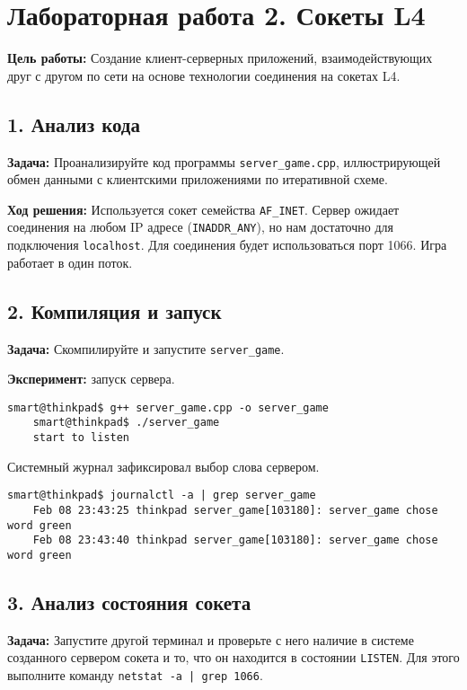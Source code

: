 \chapter*{Лабораторная работа 2. Сокеты L4}

\textbf{Цель работы:} Создание клиент-серверных приложений, взаимодействующих друг с другом по сети на основе технологии соединения на сокетах L4.

\section*{1. Анализ кода}
\textbf{Задача:} Проанализируйте код программы \texttt{server\_game.cpp}, иллюстрирующей обмен данными с клиентскими приложениями по итеративной схеме.

\textbf{Ход решения:} Используется сокет семейства \texttt{AF\_INET}. Сервер ожидает соединения на любом IP адресе (\texttt{INADDR\_ANY}), но нам достаточно для подключения \texttt{localhost}. Для соединения будет использоваться порт 1066. Игра работает в один поток.

\section*{2. Компиляция и запуск}
\textbf{Задача:} Скомпилируйте и запустите \texttt{server\_game}.

\textbf{Эксперимент:} запуск сервера.
\begin{Verbatim}[frame=single,breaklines=true,breakanywhere=true]
    smart@thinkpad$ g++ server_game.cpp -o server_game
    smart@thinkpad$ ./server_game 
    start to listen

\end{Verbatim}

Системный журнал зафиксировал выбор слова сервером.
\begin{Verbatim}[frame=single,breaklines=true,breakanywhere=true]
    smart@thinkpad$ journalctl -a | grep server_game
    Feb 08 23:43:25 thinkpad server_game[103180]: server_game chose word green
    Feb 08 23:43:40 thinkpad server_game[103180]: server_game chose word green
\end{Verbatim}

\section*{3. Анализ состояния сокета}
\textbf{Задача:} Запустите другой терминал и проверьте с него наличие в системе созданного сервером сокета и то, что он находится в состоянии \texttt{LISTEN}. Для этого выполните команду \texttt{netstat -a | grep 1066}.


